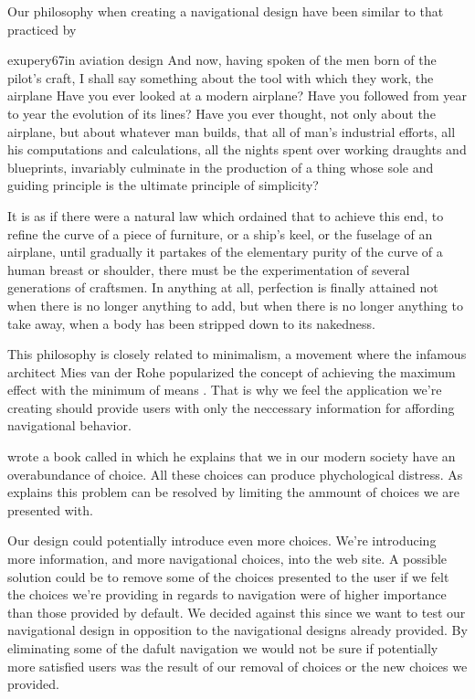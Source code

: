 Our philosophy when creating a navigational design have been
similar to that practiced by
\begin{fullquotation}[\chap{3}]{exupery67}{in aviation design}
  \noindent
  And now, having spoken of the men born of the pilot's craft, I shall say
  something about the tool with which they work, the airplane Have you
  ever looked at a modern airplane? Have you followed from year to year
  the evolution of its lines? Have you ever thought, not only about the
  airplane, but about whatever man builds, that all of man's industrial
  efforts, all his computations and calculations, all the nights spent
  over working draughts and blueprints, invariably culminate in the
  production of a thing whose sole and guiding principle is the ultimate
  principle of simplicity?

  It is as if there were a natural law which ordained that to achieve this
  end, to refine the curve of a piece of furniture, or a ship's keel, or
  the fuselage of an airplane, until gradually it partakes of the
  elementary purity of the curve of a human breast or shoulder, there must
  be the experimentation of several generations of craftsmen. In anything
  at all, perfection is finally attained not when there is no longer
  anything to add, but when there is no longer anything to take away,
  when a body has been stripped down to its nakedness.
\end{fullquotation}

This philosophy is closely related to minimalism, a movement where the
infamous architect Mies van der Rohe popularized the concept of
\dash{}achieving the maximum effect with the minimum of
means \citep{whitman69}.
That is why we feel the application we're creating should provide users
with only the neccessary information for affording navigational behavior.

\citet{schwartz04} wrote a book called
 in which he explains that
we in our modern society have an overabundance of choice. All these choices
can produce phychological distress. As \citeauthor{schwartz04} explains this
problem can be resolved by limiting the ammount of choices we are presented
with.

Our design could potentially introduce even more choices. We're
introducing more information, and more navigational choices, into the
\urort{} web site. A possible solution could be to remove some of the
choices presented to the user if we felt the choices we're providing in
regards to navigation were of higher importance than those provided by
default. We decided against this since we want to test our navigational
design in opposition to the navigational designs already provided. By
eliminating some of the dafult navigation we would not be sure
if potentially more satisfied users was the result of our removal of
choices or the new choices we provided.



